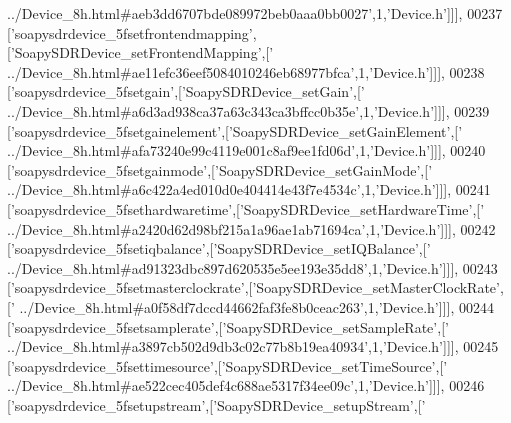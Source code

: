 \begin{DoxyCode}
{      ../Device\_8h.html#aeb3dd6707bde089972beb0aaa0bb0027'},1,\textcolor{stringliteral}{'Device.h'}]]],
00237   [\textcolor{stringliteral}{'soapysdrdevice\_5fsetfrontendmapping'},[\textcolor{stringliteral}{'SoapySDRDevice\_setFrontendMapping'},[\textcolor{stringliteral}{'
      ../Device\_8h.html#ae11efc36eef5084010246eb68977bfca'},1,\textcolor{stringliteral}{'Device.h'}]]],
00238   [\textcolor{stringliteral}{'soapysdrdevice\_5fsetgain'},[\textcolor{stringliteral}{'SoapySDRDevice\_setGain'},[\textcolor{stringliteral}{'
      ../Device\_8h.html#a6d3ad938ca37a63c343ca3bffcc0b35e'},1,\textcolor{stringliteral}{'Device.h'}]]],
00239   [\textcolor{stringliteral}{'soapysdrdevice\_5fsetgainelement'},[\textcolor{stringliteral}{'SoapySDRDevice\_setGainElement'},[\textcolor{stringliteral}{'
      ../Device\_8h.html#afa73240e99c4119e001c8af9ee1fd06d'},1,\textcolor{stringliteral}{'Device.h'}]]],
00240   [\textcolor{stringliteral}{'soapysdrdevice\_5fsetgainmode'},[\textcolor{stringliteral}{'SoapySDRDevice\_setGainMode'},[\textcolor{stringliteral}{'
      ../Device\_8h.html#a6c422a4ed010d0e404414e43f7e4534c'},1,\textcolor{stringliteral}{'Device.h'}]]],
00241   [\textcolor{stringliteral}{'soapysdrdevice\_5fsethardwaretime'},[\textcolor{stringliteral}{'SoapySDRDevice\_setHardwareTime'},[\textcolor{stringliteral}{'
      ../Device\_8h.html#a2420d62d98bf215a1a96ae1ab71694ca'},1,\textcolor{stringliteral}{'Device.h'}]]],
00242   [\textcolor{stringliteral}{'soapysdrdevice\_5fsetiqbalance'},[\textcolor{stringliteral}{'SoapySDRDevice\_setIQBalance'},[\textcolor{stringliteral}{'
      ../Device\_8h.html#ad91323dbc897d620535e5ee193e35dd8'},1,\textcolor{stringliteral}{'Device.h'}]]],
00243   [\textcolor{stringliteral}{'soapysdrdevice\_5fsetmasterclockrate'},[\textcolor{stringliteral}{'SoapySDRDevice\_setMasterClockRate'},[\textcolor{stringliteral}{'
      ../Device\_8h.html#a0f58df7dccd44662faf3fe8b0ceac263'},1,\textcolor{stringliteral}{'Device.h'}]]],
00244   [\textcolor{stringliteral}{'soapysdrdevice\_5fsetsamplerate'},[\textcolor{stringliteral}{'SoapySDRDevice\_setSampleRate'},[\textcolor{stringliteral}{'
      ../Device\_8h.html#a3897cb502d9db3c02c77b8b19ea40934'},1,\textcolor{stringliteral}{'Device.h'}]]],
00245   [\textcolor{stringliteral}{'soapysdrdevice\_5fsettimesource'},[\textcolor{stringliteral}{'SoapySDRDevice\_setTimeSource'},[\textcolor{stringliteral}{'
      ../Device\_8h.html#ae522cec405def4c688ae5317f34ee09c'},1,\textcolor{stringliteral}{'Device.h'}]]],
00246   [\textcolor{stringliteral}{'soapysdrdevice\_5fsetupstream'},[\textcolor{stringliteral}{'SoapySDRDevice\_setupStream'},[\textcolor{stringliteral}{'
}
\end{DoxyCode}
